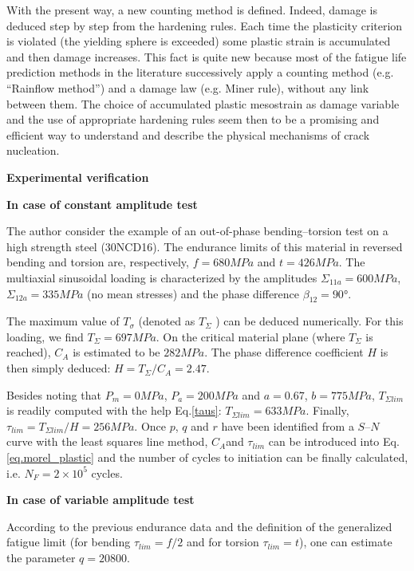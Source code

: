 With the present way, a new counting method is defined. Indeed, damage is deduced step by step from
the hardening rules. Each time the plasticity criterion is
violated (the yielding sphere is exceeded) some plastic
strain is accumulated and then damage increases. This
fact is quite new because most of the fatigue life prediction methods in the literature successively apply a counting method (e.g. ``Rainflow method'') and a damage law
(e.g. Miner rule), without any link between them. The
choice of accumulated plastic mesostrain as damage
variable and the use of appropriate hardening rules seem
then to be a promising and efficient way to understand
and describe the physical mechanisms of crack
nucleation.

\textbf{Experimental verification}
\vspace{6pt}

\textbf{In case of constant amplitude test }

The author \cite{FFE:FFE452} consider the example of an out-of-phase bending–torsion test on a high strength steel (30NCD16). The endurance limits of this material in reversed
bending and torsion are, respectively, $f=680 MPa$ and $t=426 MPa$.  The multiaxial sinusoidal loading is characterized by the amplitudes $\Sigma_{11a} =600 MPa$, $\Sigma_{12a} =335 MPa$ (no mean stresses)
and the phase difference $\beta_{12} =90°$.

The maximum value of $T_\sigma$ (denoted as $T_\Sigma$ ) can be deduced numerically. For this loading, we find $T_\Sigma=697 MPa$. On the critical material
plane (where $T_\Sigma$ is reached), $C_A$ is estimated to be $282 MPa$. The phase difference coefficient $H$ is
then simply deduced: $H=T_\Sigma /C_A =2.47$.

Besides noting that $P_m =0 MPa$, $P_a=200 MPa$ and $a=0.67$, $b=775 MPa$, $T_{\Sigma lim}$ is readily
computed with the help Eq.\eqref{taus}: $T_{\Sigma lim} =633 MPa$. Finally, $\tau_{lim} =T_{\Sigma lim} /H=256 MPa$. Once $p$, $q$ and $r$ have been identified from a $S–N$ curve with the least squares line method, $C_A $and $\tau_{lim}$ can
be introduced into Eq. \eqref{eq.morel_plastic} and the number of cycles to initiation can be finally calculated, i.e.
$N_F =2\times10^5$ cycles.

\textbf{In case of variable amplitude test }

According to the previous endurance data and the
definition of the generalized fatigue limit (for bending
$\tau_{lim} =f/2$ and for torsion $\tau_{lim}=t$), one can estimate the parameter $q=20 800$.

